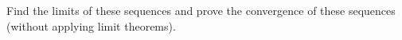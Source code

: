 \documentclass[week=2]{homework}
\begin{document}
\begin{questions}
	    Find the limits of these sequences and prove the convergence of these sequences (without applying limit theorems).
	    \begin{parts}
	    	\part
	    	
	    	\part 
	    	
	    	\part
	    \end{parts}
     \end{questions}
\end{document}
